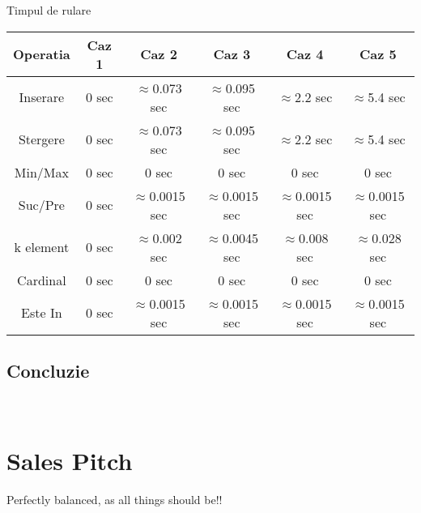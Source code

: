 \documentclass[12pt]{article}
\begin{document}
\begin{center}
Timpul de rulare\\
 \begin{tabular}{||c c c c c c||} 
 \hline
Operatia & Caz 1 & Caz 2 & Caz 3 & Caz 4 & Caz 5 \\ [0.5ex] 
 \hline
 Inserare & 	0 sec  & 	$\approx$0.073 sec & 	$\approx$0.095 sec & 	$\approx$2.2 sec & 	$\approx$5.4 sec\\ 
 \hline
 Stergere & 	0 sec  & 	$\approx$0.073 sec & 	$\approx$0.095 sec & 	$\approx$2.2 sec & 	$\approx$5.4 sec\\ 
 \hline
 Min\slash Max & 0 sec  & 	0 sec & 	0 sec & 	0 sec & 	0 sec\\ 
 \hline
 Suc\slash Pre & 	0 sec  & 	$\approx$0.0015 sec & $\approx$0.0015 sec & 	$\approx$0.0015 sec & 	$\approx$0.0015 sec\\ 
 \hline
 k element & 0 sec  & 	$\approx$0.002 sec & 	$\approx$0.0045 sec & 	$\approx$0.008 sec & 	$\approx$0.028 sec\\ 
 \hline
Cardinal & 0 sec  & 	0 sec & 	0 sec & 	0 sec & 	0 sec\\ 
 \hline
Este In &0 sec  & 	$\approx$0.0015 sec & 	$\approx$0.0015 sec & 	$\approx$0.0015 sec & 	$\approx$0.0015 sec\\ 
\hline

\end{tabular}
\end{center}
\subsection{Concluzie}
\noindent{}\\









\section{Sales Pitch}
Perfectly balanced, as all things should be!!\\
\noindent{}\\
\end{document}
